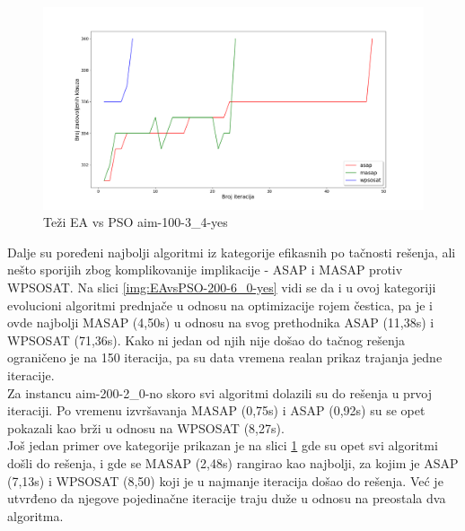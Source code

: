 \documentclass[a4paper]{article}
\begin{document}
\begin{figure}[h!]
\centering
\includegraphics[width=\textwidth]{ea-pso-aim-100-3_4-yes.png}
\caption{Teži EA vs PSO aim-100-3\_4-yes}\label{img:EAvsPSO-100-3_4-yes}
\end{figure}

Dalje su poređeni najbolji algoritmi iz kategorije efikasnih po tačnosti rešenja,
ali nešto sporijih zbog komplikovanije implikacije - ASAP i MASAP protiv WPSOSAT.
Na slici \ref{img:EAvsPSO-200-6_0-yes} vidi se da i u ovoj kategoriji evolucioni algoritmi 
prednjače u odnosu na optimizacije rojem čestica,
pa je i ovde najbolji MASAP (4,50s) u odnosu na svog prethodnika ASAP (11,38s) i
WPSOSAT (71,36s). Kako ni jedan od njih nije došao do tačnog rešenja ograničeno je na 
150 iteracija, pa su data vremena realan prikaz trajanja jedne iteracije. \\

Za instancu aim-200-2\_0-no skoro svi algoritmi dolazili su do rešenja u prvoj iteraciji.
Po vremenu izvršavanja MASAP (0,75s) i ASAP (0,92s) su se opet pokazali kao brži
u odnosu na WPSOSAT (8,27s).\\

Još jedan primer ove kategorije prikazan je na slici \ref{img:EAvsPSO-100-3_4-yes}
gde su opet svi algoritmi došli do rešenja, i gde se MASAP (2,48s) rangirao kao najbolji,
za kojim je ASAP (7,13s) i WPSOSAT (8,50) koji je u najmanje iteracija došao do rešenja.
Već je utvrđeno da njegove pojedinačne iteracije traju duže u odnosu na preostala dva
algoritma.
\end{document}
